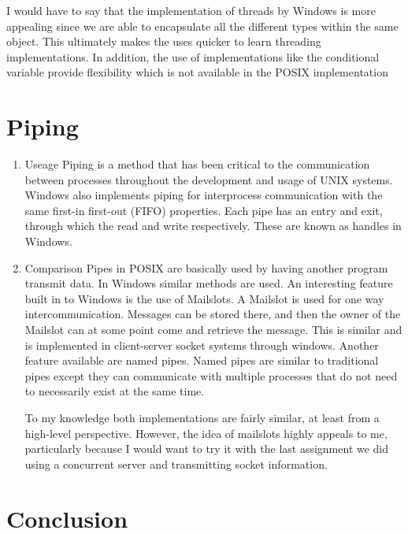 \documentclass[letterpaper,10pt,titlepage]{article}
\begin{document}
	I would have to say that the implementation of threads by Windows is more appealing since we are able to encapsulate
all the different types within the same object. This ultimately makes the uses quicker to learn threading implementations.
In addition, the use of implementations like the conditional variable provide flexibility which is not available in the
POSIX implementation


\section{Piping}
\begin{enumerate} 
	\item Useage \newline
	Piping is a method that has been critical to the communication between processes throughout the development and usage
	of UNIX systems. Windows also implements piping for interprocess communication  with the same first-in first-out (FIFO)
	properties. Each pipe has an entry and exit, through which the read and write respectively. These are known as handles in Windows.
	
	\item Comparison \newline
	Pipes in POSIX are basically used by having another program transmit data. In Windows similar methods are used. An interesting
	feature built in to Windows is the use of Mailslots. A Mailslot is used for one way intercommunication. Messages can be stored there,
	and then the owner of the Mailslot can at some point come and retrieve the message. This is similar and is implemented in client-server
	socket systems through windows. Another feature available are named pipes. Named pipes are similar to traditional pipes except they 
	can communicate with multiple processes that do not need to necessarily exist at the same time.
	
	To my knowledge both implementations are fairly similar, at least from a high-level perspective. However,
	the idea of mailslots highly appeals to me, particularly because I would want to try it with the last assignment we 
	did using a concurrent server and transmitting socket information.
	
\end{enumerate}

\section{Conclusion}
\end{document}
